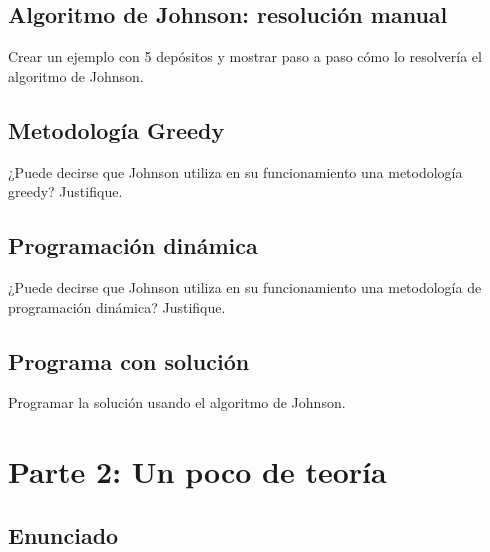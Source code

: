 \documentclass[titlepage,a4paper]{article}
\begin{document}
\newpage\subsection{Algoritmo de Johnson: resolución manual}\label{sec:parte1_4}
\begin{tcolorbox}[colback=blue!5!white,colframe=blue!75!black,title=Enunciado 1.4]
    Crear un ejemplo con 5 depósitos y mostrar paso a paso cómo lo resolvería el algoritmo de Johnson.
\end{tcolorbox}



\newpage\subsection{Metodología Greedy}\label{sec:parte1_5}
\begin{tcolorbox}[colback=blue!5!white,colframe=blue!75!black,title=Enunciado 1.5]
    ¿Puede decirse que Johnson utiliza en su funcionamiento una metodología greedy? Justifique.
\end{tcolorbox}

\newpage\subsection{Programación dinámica}\label{sec:parte1_6}
\begin{tcolorbox}[colback=blue!5!white,colframe=blue!75!black,title=Enunciado 1.6]
    ¿Puede decirse que Johnson utiliza en su funcionamiento una metodología de programación dinámica? Justifique.
\end{tcolorbox}

\newpage\subsection{Programa con solución}\label{sec:parte1_7}
\begin{tcolorbox}[colback=blue!5!white,colframe=blue!75!black,title=Enunciado 1.7]
    Programar la solución usando el algoritmo de Johnson.
\end{tcolorbox}





\newpage\section{Parte 2: Un poco de teoría}\label{sec:parte2}

\subsection{Enunciado}
\end{document}
